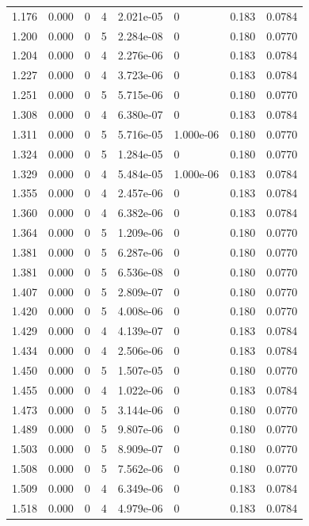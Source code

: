 \documentclass[preview]{standalone}
\begin{document}
{{{\begin{tabular}{L{1.2cm}C{1.2cm} C{0.3cm}C{0.5cm} C{1.4cm}C{1.4cm} C{1.4cm}C{1.4cm}}
  1.176  &  0.000  & 0     &  4 &  2.021e-05  & 0  & 0.183 &  0.0784   \\ 
  1.200  &  0.000  & 0     &  5 &  2.284e-08  & 0  & 0.180 &  0.0770   \\ 
  1.204  &  0.000  & 0     &  4 &  2.276e-06  & 0  & 0.183 &  0.0784   \\ 
  1.227  &  0.000  & 0     &  4 &  3.723e-06  & 0  & 0.183 &  0.0784   \\ 
  1.251  &  0.000  & 0     &  5 &  5.715e-06  & 0  & 0.180 &  0.0770   \\ 
  1.308  &  0.000  & 0     &  4 &  6.380e-07  & 0  & 0.183 &  0.0784   \\ 
  1.311  &  0.000  & 0     &  5 &  5.716e-05  & 1.000e-06  & 0.180 &  0.0770   \\ 
  1.324  &  0.000  & 0     &  5 &  1.284e-05  & 0  & 0.180 &  0.0770   \\ 
  1.329  &  0.000  & 0     &  4 &  5.484e-05  & 1.000e-06  & 0.183 &  0.0784   \\ 
  1.355  &  0.000  & 0     &  4 &  2.457e-06  & 0  & 0.183 &  0.0784   \\ 
  1.360  &  0.000  & 0     &  4 &  6.382e-06  & 0  & 0.183 &  0.0784   \\ 
  1.364  &  0.000  & 0     &  5 &  1.209e-06  & 0  & 0.180 &  0.0770   \\ 
  1.381  &  0.000  & 0     &  5 &  6.287e-06  & 0  & 0.180 &  0.0770   \\ 
  1.381  &  0.000  & 0     &  5 &  6.536e-08  & 0  & 0.180 &  0.0770   \\ 
  1.407  &  0.000  & 0     &  5 &  2.809e-07  & 0  & 0.180 &  0.0770   \\ 
  1.420  &  0.000  & 0     &  5 &  4.008e-06  & 0  & 0.180 &  0.0770   \\ 
  1.429  &  0.000  & 0     &  4 &  4.139e-07  & 0  & 0.183 &  0.0784   \\ 
  1.434  &  0.000  & 0     &  4 &  2.506e-06  & 0  & 0.183 &  0.0784   \\ 
  1.450  &  0.000  & 0     &  5 &  1.507e-05  & 0  & 0.180 &  0.0770   \\ 
  1.455  &  0.000  & 0     &  4 &  1.022e-06  & 0  & 0.183 &  0.0784   \\ 
  1.473  &  0.000  & 0     &  5 &  3.144e-06  & 0  & 0.180 &  0.0770   \\ 
  1.489  &  0.000  & 0     &  5 &  9.807e-06  & 0  & 0.180 &  0.0770   \\ 
  1.503  &  0.000  & 0     &  5 &  8.909e-07  & 0  & 0.180 &  0.0770   \\ 
  1.508  &  0.000  & 0     &  5 &  7.562e-06  & 0  & 0.180 &  0.0770   \\ 
  1.509  &  0.000  & 0     &  4 &  6.349e-06  & 0  & 0.183 &  0.0784   \\ 
  1.518  &  0.000  & 0     &  4 &  4.979e-06  & 0  & 0.183 &  0.0784   \\ 
\hline 
\end{tabular} 

}}}
\end{document}

